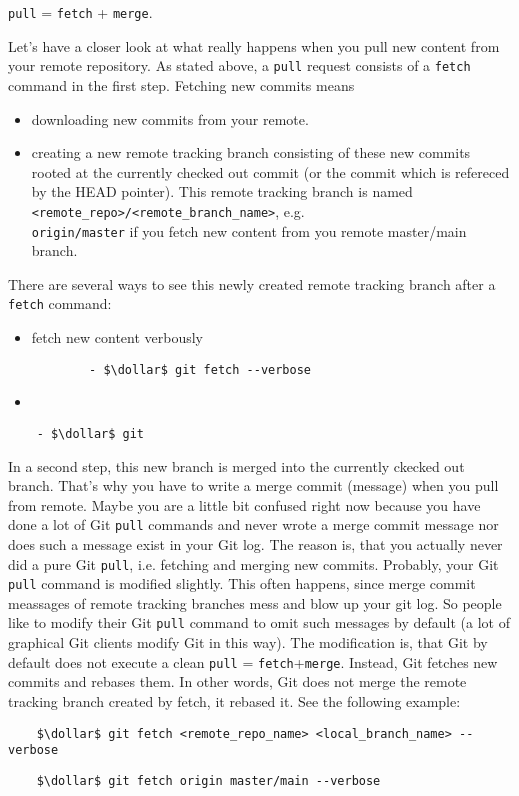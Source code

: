 \hspace{2cm} \verb*|pull| = \verb*|fetch| + \verb*|merge|.

Let's have a closer look at what really happens when you pull new content from your remote repository. As stated above, 
a \verb*|pull| request consists of a \verb*|fetch| command in the first step. Fetching new commits means
\begin{itemize}
	\item downloading new commits from your remote.
	\item creating a new remote tracking branch consisting of these new commits rooted at the currently checked out 
	      commit (or the commit which is refereced by the HEAD pointer). This remote tracking branch is named 
	      \verb*|<remote_repo>/<remote_branch_name>|, e.g.\\ 
	      \verb*|origin/master| if you fetch new content from you remote
	      master/main branch.
\end{itemize} 
There are several ways to see this newly created remote tracking branch after a \verb*|fetch| command:
\begin{itemize}
	\item fetch new content verbously\\
	\begin{lstlisting}
		- $\dollar$ git fetch --verbose 
	\end{lstlisting}
	\item 
\end{itemize} 
\begin{lstlisting}
	- $\dollar$ git  
\end{lstlisting}
In a second step, this new branch is merged into the currently ckecked out branch. That's why you have to write a 
merge commit (message) when you pull from remote.
Maybe you are a little bit confused right now because you have done a lot of Git \verb*|pull| commands and never wrote 
a merge commit message nor does such a message exist in your Git log. The reason is, that you actually never did a pure 
Git \verb*|pull|, i.e. fetching and merging new commits. Probably, your Git \verb*|pull| command is modified slightly. 
This often happens, since merge commit meassages of remote tracking branches mess and blow up your git log. So people like
to modify their Git \verb*|pull| command to omit such messages by default (a lot of graphical Git clients modify Git in this way). 
The modification is, that Git by default does not execute a clean \verb*|pull| = \verb*|fetch|+\verb*|merge|. Instead, Git fetches new
commits and rebases them. In other words, Git does not merge the remote tracking branch created by fetch, it rebased it.
See the following example:


\begin{lstlisting}
	$\dollar$ git fetch <remote_repo_name> <local_branch_name> --verbose 
\end{lstlisting}
\begin{lstlisting}
	$\dollar$ git fetch origin master/main --verbose 
\end{lstlisting}




